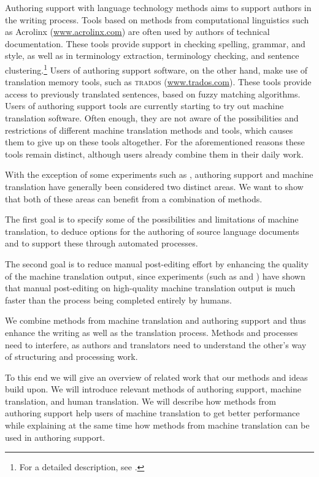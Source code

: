 \documentclass[output=paper]{LSP/langsci}
\begin{document}
Authoring support with language technology methods aims to support authors in the writing process. Tools based on methods from computational linguistics such as Acrolinx (\url{www.acrolinx.com}) are often used by authors of technical documentation. These tools provide support in checking spelling, grammar, and style, as well as in terminology extraction, terminology checking, and sentence clustering.\footnote{For a detailed description, see .} Users of authoring support software, on the other hand, make use of translation memory tools, such as \textsc{trados} (\url{www.trados.com}). These tools provide access to previously translated sentences, based on fuzzy matching algorithms. Users of authoring support tools are currently starting to try out machine translation software. Often enough, they are not aware of the possibilities and restrictions of different machine translation methods and tools, which causes them to give up on these tools altogether. For the aforementioned reasons these tools remain distinct, although users already combine them in their daily work.

With the exception of some experiments such as \citet{Roturier2006}, authoring support and machine translation have generally been considered two distinct areas. We want to show that both of these areas can benefit from a combination of methods.

The first goal is to specify some of the possibilities and limitations of machine translation, to deduce options for the authoring of source language documents and to support these through automated processes. 

The second goal is to reduce manual post-editing effort by enhancing the quality of the machine translation output, since experiments (such as \citealt{Allen2001} and \citealt{Plitt2010}) have shown that manual post-editing on high-quality machine translation output is much faster than the process being completed entirely by humans.

We combine methods from machine translation and authoring support and thus enhance the writing as well as the translation process. Methods and processes need to interfere, as authors and translators need to understand the other's way of structuring and processing work. 

To this end we will give an overview of related work that our methods and ideas build upon. We will introduce relevant methods of authoring support, machine translation, and human translation. We will describe how methods from authoring support help users of machine translation to get better performance while explaining at the same time how methods from machine translation can be used in authoring support. 
\end{document}
